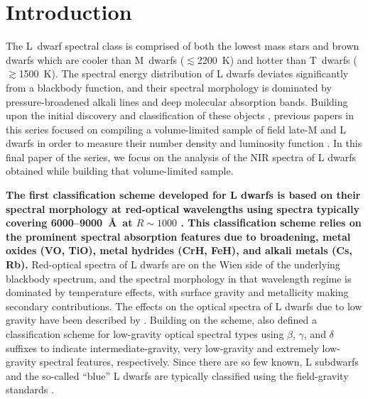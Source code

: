 \documentclass[12pt]{aastex6}
\begin{document}
\section{Introduction}
The L~dwarf spectral class is comprised of both the lowest mass stars and brown dwarfs which are cooler than M~dwarfs ($\lesssim$2200~K) and hotter than T~dwarfs ($\gtrsim$1500~K).
The spectral energy distribution of L dwarfs deviates significantly from a blackbody function, and their spectral morphology is dominated by pressure-broadened alkali lines and deep molecular absorption bands.
Building upon the initial discovery and classification of these objects \citep{Becklin88_GD165B,K99,Martin99,Kirkpatrick05}, previous papers in this series focused on compiling a volume-limited sample of field late-M and L dwarfs in order to measure their number density and luminosity function \citep[Papers V, IX, and X]{Cruz03,Cruz07,Reid08}.
In this final paper of the series, we focus on the analysis of the NIR spectra of L dwarfs obtained while building that volume-limited sample.

\textbf{The first classification scheme developed for L dwarfs is based on their spectral morphology at red-optical wavelengths using spectra typically covering 6000--9000~\AA~at $R\sim1000$ \citep{Martin99,K99,Kirkpatrick05}.
This classification scheme relies on the prominent spectral absorption features due to  broadening, metal oxides (VO, TiO), metal hydrides (CrH, FeH), and alkali metals (Cs, Rb).}
Red-optical spectra of L dwarfs are on the Wien side of the underlying blackbody spectrum, and the spectral morphology in that wavelength regime is dominated by temperature effects, with surface gravity and metallicity making secondary contributions.
The effects on the optical spectra of L dwarfs due to low gravity have been described by \citet{Martin99,Kirkpatrick06,Kirkpatrick08, Cruz09_lowg,Luhman09_taurus}.
Building on the \citet{K99} scheme, \citet{Cruz09_lowg} also defined a classification scheme for low-gravity optical spectral types using $\beta$, $\gamma$, and $\delta$ suffixes to indicate intermediate-gravity, very low-gravity and extremely low-gravity spectral features, respectively.
Since there are so few known, L subdwarfs and the so-called ``blue'' L dwarfs are typically classified using the field-gravity standards \citep{Gizis:2006jl,Burgasser07_subdwarfs, Burgasser08_blue, Kirkpatrick10, Kirkpatrick:2014kv}.
\end{document}
